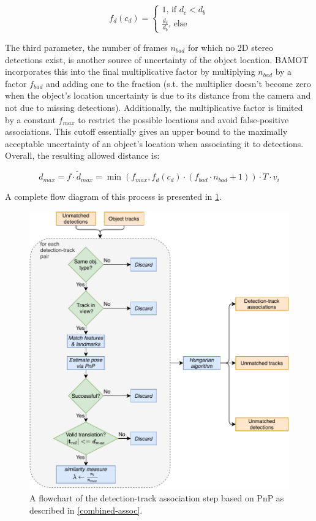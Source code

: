 \documentclass[headsepline, hidelinks, footsepline, footinclude=false, oneside, fontsize=11pt, paper=a4, listof=totoc, bibliography=totoc]{scrbook}
\begin{document}
\begin{equation}
\label{eq:dist-factor}
f_d(c_d) = 
\begin{cases}
1{}\text{, if }{}d_c < d_b \\
\frac{d_c}{d_b}{}\text{, else}
\end{cases}
\end{equation}

The third parameter, the number of frames \(n_{bad}\) for which no 2D stereo detections exist, is another source of uncertainty of the object location. 
BAMOT incorporates this into the final multiplicative factor by multiplying \(n_{bad}\) by a factor \(f_{bad}\) and adding one to the fraction (s.t. the multiplier doesn't become zero when the object's location uncertainty is due to its distance from the camera and not due to missing detections).
Additionally, the multiplicative factor is limited by a constant \(f_{max}\) to restrict the possible locations and avoid false-positive associations. This cutoff essentially gives an upper bound to the maximally
acceptable uncertainty of an object's location when associating it to detections.
Overall, the resulting allowed distance is:

\begin{equation}
\label{eq:max-dist}
d_{max} = f \cdot \tilde{d}_{max} = \min(f_{max}, f_d(c_d) \cdot (f_{bad} \cdot n_{bad} + 1)) \cdot T \cdot v_i
\end{equation}

A complete flow diagram of this process is presented in \cref{fig:pnp-assoc-flow}.

\begin{figure}[htbp]
\centering
\includegraphics[width=.9\linewidth]{figures/match_detections_tracks_pnp.pdf}
\caption{\label{fig:pnp-assoc-flow}A flowchart of the detection-track association step based on PnP as described in \cref{combined-assoc}.}
\end{figure}
\end{document}
